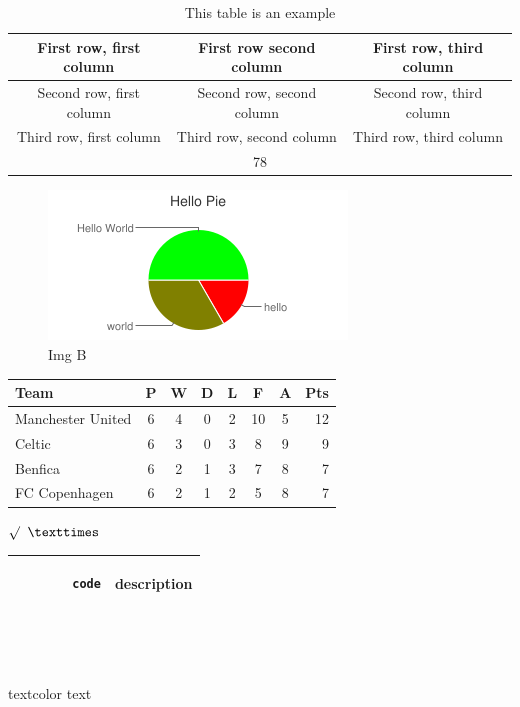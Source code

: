 \documentclass{ctexart}
\begin{document}
\begin{CJK*}{GBK}{song}
\begin{table}[hbtp]
\caption{This table is an example}
\begin{center}
\begin{tabular}{c|c|c}
First row, first column & First row second column & First row, third column \\ \hline
Second row, first column & Second row, second column & Second row, third column \\
Third row, first column & Third row, second column & Third row, third column \\
\multicolumn{3}{c}{78}
\end{tabular}
\end{center}
\label{exampletable}
\end{table}



\begin{figure}[hbtp]
\caption{Img B}
\begin{center}
\includegraphics[scale=0.75]{pic/b.png}
\end{center}
\label{fig1}
\end{figure}

\begin{tabular}{l*{6}{c}r}
Team              & P & W & D & L & F  & A & Pts \\
\hline
Manchester United & 6 & 4 & 0 & 2 & 10 & 5 & 12  \\
Celtic            & 6 & 3 & 0 & 3 &  8 & 9 &  9  \\
Benfica           & 6 & 2 & 1 & 3 &  7 & 8 &  7  \\
FC Copenhagen     & 6 & 2 & 1 & 2 &  5 & 8 &  7  \\
\end{tabular}

${\surd}$
${\texttimes}$
\begin{tabular}{| p{5cm} | c |}
        \hline
        \begin{verbatim}
        code
        \end{verbatim}
        & description
        \\ \hline
\end{tabular}
\\
\\
\\
\textcolor[rgb]{0.69,0.94,0.71}{textcolor text}


\end{CJK*}
\end{document}
